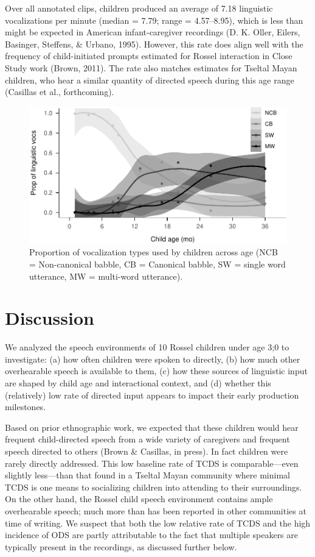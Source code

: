 \documentclass[,man,floatsintext]{apa6}
\begin{document}
Over all annotated clips, children produced an average of 7.18
linguistic vocalizations per minute (median = 7.79; range = 4.57--8.95),
which is less than might be expected in American infant-caregiver
recordings (D. K. Oller, Eilers, Basinger, Steffens, \& Urbano, 1995).
However, this rate does align well with the frequency of child-initiated
prompts estimated for Rossel interaction in Close Study work (Brown,
2011). The rate also matches estimates for Tseltal Mayan children, who
hear a similar quantity of directed speech during this age range
(Casillas et al., forthcoming).

\begin{figure}
\centering
\includegraphics{Yeli-CLE_files/figure-latex/fig4-1.pdf}
\caption{\label{fig:fig4}Proportion of vocalization types used by children
across age (NCB = Non-canonical babble, CB = Canonical babble, SW =
single word utterance, MW = multi-word utterance).}
\end{figure}

\section{Discussion}\label{disc}

We analyzed the speech environments of 10 Rossel children under age 3;0
to investigate: (a) how often children were spoken to directly, (b) how
much other overhearable speech is available to them, (c) how these
sources of linguistic input are shaped by child age and interactional
context, and (d) whether this (relatively) low rate of directed input
appears to impact their early production milestones.

Based on prior ethnographic work, we expected that these children would
hear frequent child-directed speech from a wide variety of caregivers
and frequent speech directed to others (Brown \& Casillas, in press). In
fact children were rarely directly addressed. This low baseline rate of
TCDS is comparable---even slightly less---than that found in a Tseltal
Mayan community where minimal TCDS is one means to socializing children
into attending to their surroundings. On the other hand, the Rossel
child speech environment contains ample overhearable speech; much more
than has been reported in other communities at time of writing. We
suspect that both the low relative rate of TCDS and the high incidence
of ODS are partly attributable to the fact that multiple speakers are
typically present in the recordings, as discussed further below.
\end{document}
